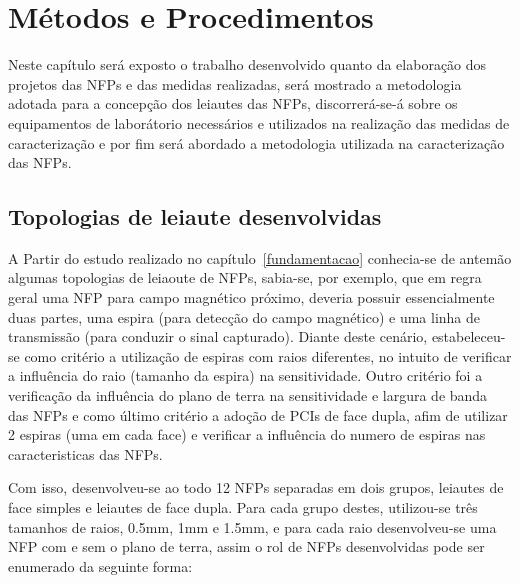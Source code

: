 \chapter{Métodos e Procedimentos}
Neste capítulo será exposto o trabalho desenvolvido quanto da elaboração dos projetos das NFPs e das medidas realizadas, será mostrado a metodologia adotada para a concepção dos leiautes das NFPs, discorrerá-se-á sobre os equipamentos de laborátorio necessários e utilizados na realização das medidas de caracterização e por fim será abordado a metodologia utilizada na caracterização das NFPs.

\section{Topologias de leiaute desenvolvidas}
A Partir do estudo realizado no capítulo~\ref{fundamentacao} conhecia-se de antemão algumas topologias de leiaoute de NFPs, sabia-se, por exemplo, que em regra geral uma NFP para campo magnético próximo, deveria possuir essencialmente duas partes, uma espira (para detecção do campo magnético) e uma linha de transmissão (para conduzir o sinal capturado). Diante deste cenário, estabeleceu-se como critério a utilização de espiras com raios diferentes, no intuito de verificar a influência do raio (tamanho da espira) na sensitividade. Outro critério foi a verificação da influência do plano de terra na sensitividade e largura de banda das NFPs e como último critério a adoção de PCIs de face dupla, afim de utilizar 2 espiras (uma em cada face) e verificar a influência do numero de espiras nas caracteristicas das NFPs.

Com isso, desenvolveu-se ao todo 12 NFPs separadas em dois grupos, leiautes de face simples e leiautes de face dupla. Para cada grupo destes, utilizou-se três tamanhos de raios, 0.5mm, 1mm e 1.5mm, e para cada raio desenvolveu-se uma NFP com e sem o plano de terra, assim o rol de NFPs desenvolvidas pode ser enumerado da seguinte forma:

